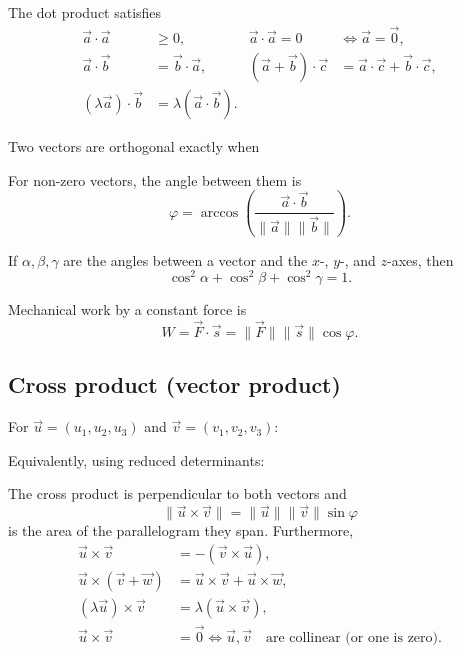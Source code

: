 \documentclass{article}
\begin{document}
The dot product satisfies
\begin{align*}
    \vec{a}\cdot\vec{a}&\geq0,&
    \vec{a}\cdot\vec{a}=0&\Longleftrightarrow\vec{a}=\vec{0},\\
    \vec{a}\cdot\vec{b}&=\vec{b}\cdot\vec{a},&
    (\vec{a}+\vec{b})\cdot\vec{c}
        &=\vec{a}\cdot\vec{c}+\vec{b}\cdot\vec{c},\\
    (\lambda\vec{a})\cdot\vec{b}
        &=\lambda(\vec{a}\cdot\vec{b}).
\end{align*}

Two vectors are orthogonal exactly when

For non-zero vectors, the angle between them is
\[
    \varphi=\arccos\left(
    \frac{\vec{a}\cdot\vec{b}}
    {\lVert\vec{a}\rVert\lVert\vec{b}\rVert}\right).
\]

If $\alpha,\beta,\gamma$ are the angles between a vector and the
$x$-, $y$-, and $z$-axes, then
\[
    \cos^2\alpha+\cos^2\beta+\cos^2\gamma=1.
\]

Mechanical work by a constant force is
\[
    W=\vec{F}\cdot\vec{s}
    =\lVert\vec{F}\rVert\lVert\vec{s}\rVert\cos\varphi.
\]

\subsection{Cross product (vector product)}
For $\vec{u}=(u_1,u_2,u_3)$ and
$\vec{v}=(v_1,v_2,v_3)$:

Equivalently, using reduced determinants:

The cross product is perpendicular to both vectors and
\[
    \lVert\vec{u}\times\vec{v}\rVert
    =\lVert\vec{u}\rVert\lVert\vec{v}\rVert\sin\varphi
\]
is the area of the parallelogram they span. Furthermore,
\begin{align*}
    \vec{u}\times\vec{v}&=-(\vec{v}\times\vec{u}),\\
    \vec{u}\times(\vec{v}+\vec{w})
        &=\vec{u}\times\vec{v}+\vec{u}\times\vec{w},\\
    (\lambda\vec{u})\times\vec{v}
        &=\lambda(\vec{u}\times\vec{v}),\\
    \vec{u}\times\vec{v}&=\vec{0}
        \Longleftrightarrow \vec{u},\vec{v}\quad
        \text{are collinear (or one is zero).}
\end{align*}
\end{document}
